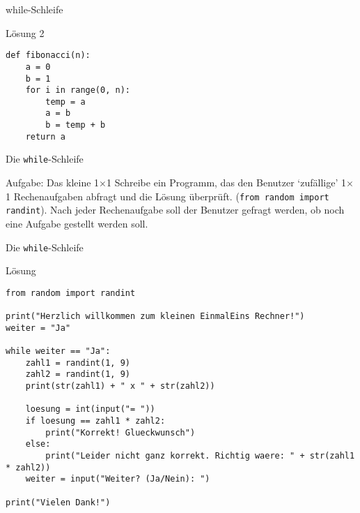 \begin{frame}[fragile]{while-Schleife}
\begin{exampleblock}{Lösung 2}
\begin{lstlisting}
def fibonacci(n):
    a = 0
    b = 1
    for i in range(0, n):
        temp = a
        a = b
        b = temp + b
    return a
\end{lstlisting}
\end{exampleblock}
\end{frame}

\begin{frame}{Die \texttt{while}-Schleife}
\begin{block}{Aufgabe: Das kleine 1$\times$1}
Schreibe ein Programm, das den Benutzer `zufällige' 1$\times$1 Rechenaufgaben abfragt und 
die Lösung überprüft. (\lstinline{from random import randint}). Nach jeder Rechenaufgabe 
soll der Benutzer gefragt werden, ob noch eine Aufgabe gestellt werden soll.
\end{block}
\end{frame}

\begin{frame}[fragile]{Die \texttt{while}-Schleife}
\begin{exampleblock}{Lösung}
\begin{lstlisting}
from random import randint

print("Herzlich willkommen zum kleinen EinmalEins Rechner!")
weiter = "Ja"

while weiter == "Ja":
    zahl1 = randint(1, 9)
    zahl2 = randint(1, 9)
    print(str(zahl1) + " x " + str(zahl2))

    loesung = int(input("= "))
    if loesung == zahl1 * zahl2:
        print("Korrekt! Glueckwunsch")
    else:
        print("Leider nicht ganz korrekt. Richtig waere: " + str(zahl1 * zahl2))
    weiter = input("Weiter? (Ja/Nein): ")

print("Vielen Dank!")
\end{lstlisting}
\end{exampleblock}
\end{frame}



